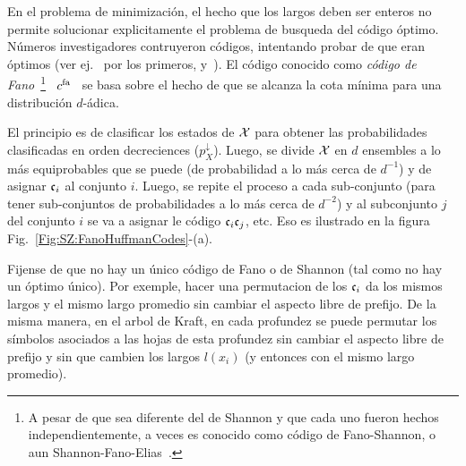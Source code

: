 En el problema  de minimizaci\'on, el hecho que los largos  deben ser enteros no
permite solucionar explicitamente el problema de busqueda del c\'odigo \'optimo.
N\'umeros investigadores  contruyeron c\'odigos,  intentando probar de  que eran
\'optimos (ver  ej.~\cite{Sha48, ShaWea64,  Fan49} por los  primeros, y~\cite[\&
ref.]{CovTho06}).  El c\'odigo conocido  como {\it c\'odigo de Fano}~\footnote{A
  pesar  de que  sea  diferente del  de Shannon  y  que cada  uno fueron  hechos
  independientemente, a veces  es conocido como c\'odigo de  Fano-Shannon, o aun
  Shannon-Fano-Elias~\cite{CovTho06, KraLiu15}.}  \ $c^{\mathrm{fa}}$  \ se basa  sobre el
hecho de que se alcanza la cota m\'inima para una distribuci\'on $d$-\'adica.
%
\begin{definicion}
\label{Def:SZ:FanoCode}
%
  El  principio  es  de  clasificar   los  estados  de  $\mathcal{X}$  para  obtener  las
  probabilidades clasificadas en  orden decreciences ($p_X^\downarrow$).  Luego,
  se divide $\mathcal{X}$ en $d$ ensembles a  lo m\'as equiprobables que se puede (\ie de
  probabilidad a lo  m\'as cerca de $d^{-1}$) y de  asignar $\mathfrak{c}_i$ al conjunto
  $i$.   Luego,   se  repite  el   proceso  a  cada  sub-conjunto   (para  tener
  sub-conjuntos de probabilidades a lo m\'as cerca de $d^{-2}$) y al subconjunto
  $j$ del conjunto $i$ se va a asignar le c\'odigo $\mathfrak{c}_i \mathfrak{c}_j$, etc.  Eso es
  ilustrado en la figura Fig.~\ref{Fig:SZ:FanoHuffmanCodes}-(a).
\end{definicion}
%

Fijense de que no hay un \'unico c\'odigo  de Fano o de Shannon (tal como no hay
un \'optimo  \'unico).  Por exemple, hacer  una permutacion de  los $\mathfrak{c}_i$ da
los mismos  largos y  el mismo largo  promedio sin  cambiar el aspecto  libre de
prefijo. De la  misma manera, en el  arbol de Kraft, en cada  profundez se puede
permutar los s\'imbolos  asociados a las hojas de esta  profundez sin cambiar el
aspecto libre de  prefijo y sin que cambien los largos  $l(x_i)$ (y entonces con
el mismo largo promedio).

